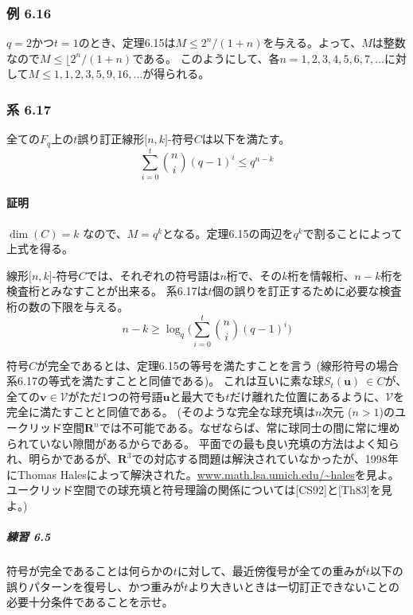 \documentclass[12pt,a4paper]{article}
\begin{document}
    \subsubsection*{例 6.16}

      $q = 2$かつ$t = 1$のとき、定理6.15は$M \leq 2^n / (1 + n)$を与える。よって、$M$は整数なので$M \leq \lfloor 2^n / (1 + n)$である。
      このようにして、各$n = 1,2,3,4,5,6,7, \dots$に対して$M \leq 1, 1, 2, 3, 5 ,9, 16, \dots$が得られる。
  
    \subsubsection*{系 6.17}

      全ての$F_q$上の$t$誤り訂正線形$\lbrack n, k \rbrack$-符号$C$は以下を満たす。
      $$ \sum_{i=0}^t \binom{n}{i} {(q - 1)}^i \leq q^{n-k} $$
    
      \paragraph{証明}

        $\dim (C) = k$ なので、$M = q^k$となる。定理6.15の両辺を$q^k$で割ることによって上式を得る。

      線形$\lbrack n, k \rbrack$-符号$C$では、それぞれの符号語は$n$桁で、その$k$桁を情報桁、$n - k$桁を検査桁とみなすことが出来る。
      系6.17は$t$個の誤りを訂正するために必要な検査桁の数の下限を与える。
      $$n - k \geq \log_q \big( \sum_{i=0}^t \binom{n}{i} {(q - 1)}^i \big) $$
    
    符号$C$が完全であるとは、定理6.15の等号を満たすことを言う (線形符号の場合系6.17の等式を満たすことと同値である)。
    これは互いに素な球$S_t(\mathbf{u}) \ \in C$が、全ての$\mathbf{v} \in \mathcal{V}$がただ1つの符号語$\mathbf{u}$と最大でも$t$だけ離れた位置にあるように、$\mathcal{V}$を完全に満たすことと同値である。
    (そのような完全な球充填は$n$次元 ($n > 1$)のユークリッド空間$\mathbf{R}^n$では不可能である。なぜならば、常に球同士の間に常に埋められていない隙間があるからである。
      平面での最も良い充填の方法はよく知られ、明らかであるが、$\mathbf{R}^3$での対応する問題は解決されていなかったが、1998年にThomas Halesによって解決された。\href{http://www.math.lsa.umich.edu/~hales}{www.math.lsa.umich.edu/\~{}hales}を見よ。
    ユークリッド空間での球充填と符号理論の関係については[CS92]と[Th83]を見よ。)

      \subparagraph{練習 6.5}

        符号が完全であることは何らかの$t$に対して、最近傍復号が全ての重みが$t$以下の誤りパターンを復号し、かつ重みが$t$より大きいときは一切訂正できないことの必要十分条件であることを示せ。
\end{document}
